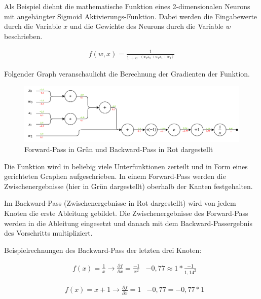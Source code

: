 Als Beispiel diehnt die mathematische Funktion eines 2-dimensionalen Neurons mit angehängter Sigmoid Aktivierungs-Funktion. Dabei werden die Eingabewerte durch die Variable $ x $ und die Gewichte des Neurons durch die Variable $ w $ beschrieben.

\begin{align}
	f(w, x) = \frac{1}{ 1 + e^{ - (w_{0}x_{0} + w_{1}x_{1} + w_{2}) } }
\end{align}

\pagebreak

Folgender Graph veranschaulicht die Berechnung der Gradienten der Funktion.

\begin{figure}[H]
	\centering
	\includegraphics[width=1\textwidth]{resources/content/backpropagation.png}
	\caption{Forward-Pass in Grün und Backward-Pass in Rot dargestellt \cite{cs231n2}}
	\label{img:backpropagation_img}
\end{figure}

Die Funktion wird in beliebig viele Unterfunktionen zerteilt und in Form eines gerichteten Graphen aufgeschrieben.
In einem Forward-Pass werden die Zwischenergebnisse (hier in Grün dargestellt) oberhalb der Kanten festgehalten.

Im Backward-Pass (Zwischenergebnisse in Rot dargestellt) wird von jedem Knoten die erste Ableitung gebildet. Die Zwischenergebnisse des Forward-Pass werden in die Ableitung eingesetzt und danach mit dem Backward-Passergebnis des Vorschritts multipliziert.

Beispielrechnungen des Backward-Pass der letzten drei Knoten: 

\begin{align}
	& f(x) = \frac{1}{x} \rightarrow \frac{\partial f}{\partial x} = \frac{-1}{ x^{2} }
	& -0,77 \approx 1 * \frac{-1}{ 1,14^{2} }
\end{align}

\begin{align}
	& f(x) = x + 1 \rightarrow \frac{\partial f}{\partial x} = 1
	& -0,77 = -0,77 * 1
\end{align}

